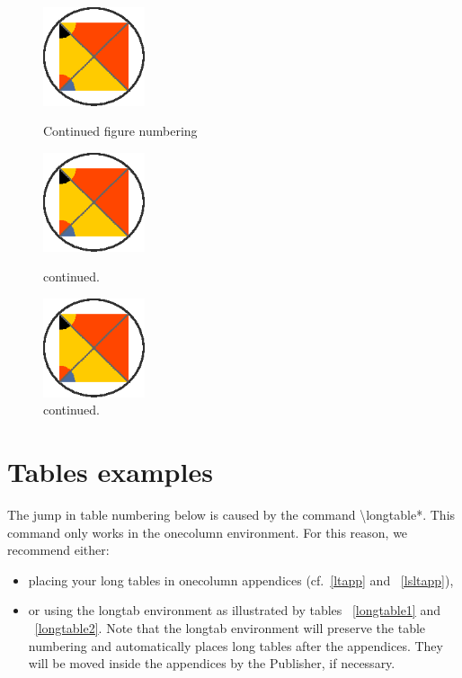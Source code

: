 \documentclass{aa}
\begin{document}

    \begin{figure}
    \centering
    \includegraphics[width=3cm]{figure.eps}
      \caption{Continued figure numbering}
         \label{cont1}
    
    \centering
    \ContinuedFloat %
    \includegraphics[width=3cm]{figure.eps}
        \caption{continued.}
             \label{cont2}

    \centering
    \ContinuedFloat %
    \includegraphics[width=3cm]{figure.eps}
        \caption{continued.}
             \label{cont3}
    \end{figure}


\clearpage

\section{Tables examples}



The jump in table numbering below is caused by the command
\textbackslash longtable*. This command only works in the onecolumn
environment. For this reason, we recommend either:
\begin{itemize}
\item placing your long tables in onecolumn appendices (cf.~\ref{ltapp} and ~\ref{lsltapp}),
\item or using the longtab environment as illustrated by tables ~\ref{longtable1} and ~\ref{longtable2}.
Note that the longtab environment will preserve the table
numbering and automatically places long tables after the appendices.
They will be moved inside the appendices by the Publisher, if necessary.
\end{itemize}
\end{document}
